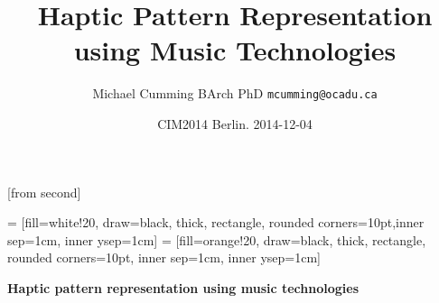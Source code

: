 \documentclass[handout]{beamer}
\title{Haptic Pattern Representation using Music Technologies}
\date[ISPN ’80]{CIM2014 Berlin. 2014-12-04}
\author[MJC]{Michael Cumming BArch PhD \texttt{mcumming@ocadu.ca}}
\begin{document}
[from second]




 = [fill=white!20, draw=black, thick,
    rectangle, rounded corners=10pt,inner sep=1cm, inner ysep=1cm]
 = [fill=orange!20, draw=black, thick,
    rectangle, rounded corners=10pt, inner sep=1cm, inner ysep=1cm]

\begin{center}
\textbf{Haptic pattern representation using music technologies}\\
\end{center}

\begin{frame}
\titlepage
\end{frame}
\end{document}
